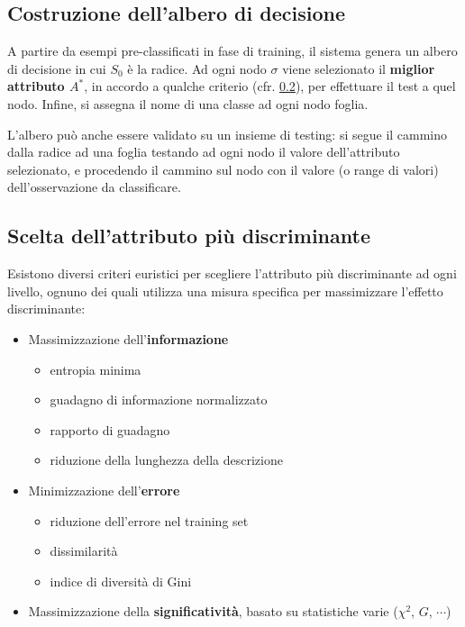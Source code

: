 \documentclass[preprint]{acm_proc_article-sp}
\begin{document}
\subsection{Costruzione dell'albero di decisione}
A partire da esempi pre-classificati in fase di training, il sistema genera un albero di decisione in cui $S_0$ è la radice. Ad ogni nodo $\sigma$ viene selezionato il \textbf{miglior attributo $A^*$}, in accordo a qualche criterio (cfr. \ref{scelta-attributo}), per effettuare il test a quel nodo. Infine, si assegna il nome di una classe ad ogni nodo foglia.

L'albero può anche essere validato su un insieme di testing: si segue il cammino dalla radice ad una foglia testando ad ogni nodo il valore dell'attributo selezionato, e procedendo il cammino sul nodo con il valore (o range di valori) dell'osservazione da classificare.

\subsection{Scelta dell'attributo più discriminante}
\label{scelta-attributo}
Esistono diversi criteri euristici per scegliere l'attributo più discriminante ad ogni livello, ognuno dei quali utilizza una misura specifica per massimizzare l'effetto discriminante:
\begin{itemize}
\item Massimizzazione dell'\textbf{informazione}
	\begin{itemize}
	\item entropia minima
	\item guadagno di informazione normalizzato
	\item rapporto di guadagno
	\item riduzione della lunghezza della descrizione
	\end{itemize}
\item Minimizzazione dell'\textbf{errore}
	\begin{itemize}
	\item riduzione dell'errore nel training set
	\item dissimilarità
	\item indice di diversità di Gini
	\end{itemize}
\item Massimizzazione della \textbf{significatività}, basato su statistiche varie ($\chi^2$, $G$, $\cdots$)
\end{itemize}
\end{document}
